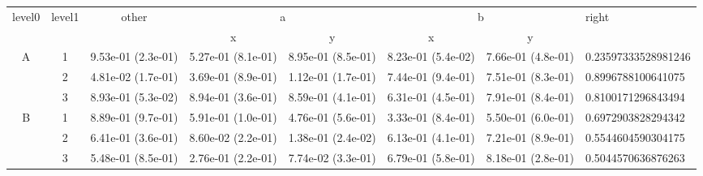 \begin{tabular}{cccccccl}
\toprule
\multirow{2}{*}{level0} & \multirow{2}{*}{level1}& \multirow{2}{*}{other}&\multicolumn{2}{c}{a}&\multicolumn{2}{c}{b}& \multirow{2}{*}{right}\tabularnewline
\cmidrule(lr){4-5}
\cmidrule(lr){6-7}
&&&x&y&x&y\tabularnewline
\midrule
\multirow{3}{*}{A}&1& 9.53e-01 (2.3e-01)& 5.27e-01 (8.1e-01)& 8.95e-01 (8.5e-01)& 8.23e-01 (5.4e-02)& 7.66e-01 (4.8e-01)& 0.23597333528981246\tabularnewline
&2& 4.81e-02 (1.7e-01)& 3.69e-01 (8.9e-01)& 1.12e-01 (1.7e-01)& 7.44e-01 (9.4e-01)& 7.51e-01 (8.3e-01)& 0.8996788100641075\tabularnewline
&3& 8.93e-01 (5.3e-02)& 8.94e-01 (3.6e-01)& 8.59e-01 (4.1e-01)& 6.31e-01 (4.5e-01)& 7.91e-01 (8.4e-01)& 0.8100171296843494\tabularnewline
\midrule
\multirow{3}{*}{B}&1& 8.89e-01 (9.7e-01)& 5.91e-01 (1.0e-01)& 4.76e-01 (5.6e-01)& 3.33e-01 (8.4e-01)& 5.50e-01 (6.0e-01)& 0.6972903828294342\tabularnewline
&2& 6.41e-01 (3.6e-01)& 8.60e-02 (2.2e-01)& 1.38e-01 (2.4e-02)& 6.13e-01 (4.1e-01)& 7.21e-01 (8.9e-01)& 0.5544604590304175\tabularnewline
&3& 5.48e-01 (8.5e-01)& 2.76e-01 (2.2e-01)& 7.74e-02 (3.3e-01)& 6.79e-01 (5.8e-01)& 8.18e-01 (2.8e-01)& 0.5044570636876263\tabularnewline
\bottomrule
\end{tabular}
